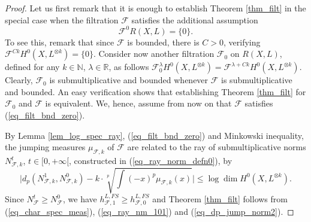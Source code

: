 \documentclass[12pt]{article}
\numberwithin{equation}{section}
\theoremstyle{theorem}
\theoremstyle{definition}
\theoremstyle{remark}
\newcommand{\real}{\mathbb{R}}
\newcommand{\nat}{\mathbb{N}}
\begin{document}
	\begin{proof}
		Let us first remark that it is enough to establish Theorem \ref{thm_filt} in the special case when the filtration $\mathcal{F}$ satisfies the additional assumption 
		\begin{equation}\label{eq_filt_bnd_zero}
			\mathcal{F}^0 R(X, L) = \{0\}.
		\end{equation}
		To see this, remark that since $\mathcal{F}$ is bounded, there is $C > 0$, verifying $\mathcal{F}^{C k} H^0(X, L^{\otimes k}) = \{0\}$.
		Consider now another filtration $\mathcal{F}_0$ on $R(X, L)$, defined for any $k \in \nat$, $\lambda \in \real$, as follows $\mathcal{F}_0^{\lambda} H^0(X, L^{\otimes k}) = \mathcal{F}^{\lambda + Ck} H^0(X, L^{\otimes k})$.
		Clearly, $\mathcal{F}_0$ is submultiplicative and bounded whenever $\mathcal{F}$ is submultiplicative and bounded.
		An easy verification shows that establishing Theorem \ref{thm_filt} for $\mathcal{F}_0$ and $\mathcal{F}$ is equivalent. We, hence, assume from now on that $\mathcal{F}$ satisfies (\ref{eq_filt_bnd_zero}).
		\par 
		By Lemma \ref{lem_log_spec_ray}, (\ref{eq_filt_bnd_zero}) and Minkowski inequality, the jumping measures $\mu_{\mathcal{F}, k}$ of $\mathcal{F}$ are related to the ray of submultiplicative norms $N_{\mathcal{F}, k}^t$, $t \in [0, +\infty[$, constructed in (\ref{eq_ray_norm_defn0}), by
		\begin{equation}\label{eq_dp_jump_norm2}
			\Big| 
			d_p(N_{\mathcal{F}, k}^1, N_{\mathcal{F}, k}^0)
			-
			k
			\cdot
			\sqrt[p]{
			\int (-x)^p  \mu_{\mathcal{F}, k}(x)}
			\Big|
			\leq
			\log \dim H^0(X, L^{\otimes k}).
		\end{equation}
		Since $N_{\mathcal{F}}^t \geq N_{\mathcal{F}}^0$, we have $h^{L, FS}_{\mathcal{F}, 1} \geq h^{L, FS}_{\mathcal{F}, 0}$ and Theorem \ref{thm_filt} follows from (\ref{eq_char_spec_meas}), (\ref{eq_ray_nm_101}) and (\ref{eq_dp_jump_norm2}).
	\end{proof}		
	 
 
\end{document}
